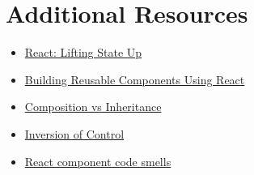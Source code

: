 \section{Additional Resources}

\begin{itemize}[leftmargin=*]
    \item \href{https://reactjs.org/docs/lifting-state-up.html}{React: Lifting State Up}
    \item \href{https://buttercms.com/blog/building-reusable-components-using-react}{Building Reusable Components Using React}
    \item \href{https://programmingwithmosh.com/react/react-composition-vs-inheritance/}{Composition vs Inheritance}
    \item \href{https://kentcdodds.com/blog/inversion-of-control}{Inversion of Control}
    \item \href{https://antongunnarsson.com/react-component-code-smells/}{React component code smells}
\end{itemize}

